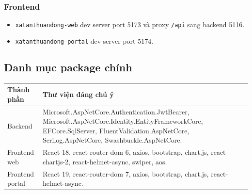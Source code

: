 \documentclass[12pt,a4paper]{article}
\begin{document}
\subsubsection{Frontend}
\begin{itemize}[leftmargin=1.1cm]
  \item \texttt{xatanthuandong-web} dev server port 5173 và proxy \texttt{/api} sang backend 5116.
  \item \texttt{xatanthuandong-portal} dev server port 5174.
\end{itemize}

\subsection{Danh mục package chính}
\begin{longtable}{p{4.3cm}p{8.9cm}}
\toprule
\textbf{Thành phần} & \textbf{Thư viện đáng chú ý} \\
\midrule
Backend & Microsoft.AspNetCore.Authentication.JwtBearer, Microsoft.AspNetCore.Identity.EntityFrameworkCore, EFCore.SqlServer, FluentValidation.AspNetCore, Serilog.AspNetCore, Swashbuckle.AspNetCore. \\
Frontend web & React 18, react-router-dom 6, axios, bootstrap, chart.js, react-chartjs-2, react-helmet-async, swiper, aos. \\
Frontend portal & React 19, react-router-dom 7, axios, bootstrap, chart.js, react-helmet-async. \\
\bottomrule
\end{longtable}
\end{document}
